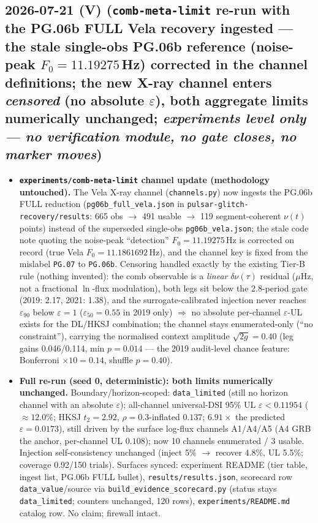 \subsection*{2026-07-21 (V) (\texttt{comb-meta-limit} re-run with the PG.06b FULL Vela recovery ingested --- the stale single-obs PG.06b reference (noise-peak $F_0=11.19275$\,Hz) corrected in the channel definitions; the new X-ray channel enters \emph{censored} (no absolute $\varepsilon$), both aggregate limits numerically unchanged; \emph{experiments level only --- no verification module, no gate closes, no marker moves})}
\begin{itemize}[leftmargin=1.5em]
\item \textbf{\texttt{experiments/comb-meta-limit} channel update (methodology untouched).} The Vela
X-ray channel (\texttt{channels.py}) now ingests the PG.06b FULL reduction
(\texttt{pg06b\_full\_vela.json} in \texttt{pulsar-glitch-recovery/results}: 665 obs $\to$ 491
usable $\to$ 119 segment-coherent $\nu(t)$ points) instead of the superseded single-obs
\texttt{pg06b\_vela.json};
the stale code note quoting the noise-peak ``detection'' $F_0=11.19275$\,Hz is corrected on record
(true Vela $F_0=11.1861692$\,Hz), and the channel key is fixed from the mislabel \texttt{PG.07} to
\texttt{PG.06b}. Censoring handled exactly by the existing Tier-B rule (nothing invented): the comb
observable is a \emph{linear} $\delta\nu(\tau)$ residual ($\mu$Hz, not a fractional $\ln$-flux
modulation), both legs sit below the 2.8-period gate (2019: 2.17, 2021: 1.38), and the
surrogate-calibrated injection never reaches $\varepsilon_{90}$ below $\varepsilon=1$
($\varepsilon_{50}=0.55$ in 2019 only) $\Rightarrow$ no absolute per-channel $\varepsilon$-UL exists
for the DL/HKSJ combination; the channel stays enumerated-only (``no constraint''), carrying the
normalised context amplitude $\sqrt{2g}=0.40$ (leg gains 0.046/0.114, min $p=0.014$ --- the 2019
audit-level chance feature: Bonferroni $\times10=0.14$, shuffle $p=0.40$).
\item \textbf{Full re-run (seed 0, deterministic): both limits numerically unchanged.}
Boundary/horizon-scoped: \texttt{data\_limited} (still no horizon channel with an absolute
$\varepsilon$); all-channel universal-DSI 95\% UL $\varepsilon<0.11954$ ($\approx12.0\%$; HKSJ
$t_2=2.92$, $\rho=0.3$-inflated $0.137$; $6.91\times$ the predicted $\varepsilon=0.0173$), still
driven by the surface log-flux channels A1/A4/A5 (A4 GRB the anchor, per-channel UL $0.108$); now 10
channels enumerated / 3 usable. Injection self-consistency unchanged (inject 5\% $\to$ recover
4.8\%, UL 5.5\%; coverage 0.92/150 trials). Surfaces synced: experiment README (tier table, ingest
list, PG.06b FULL bullet), \texttt{results/results.json}, scorecard row \texttt{data\_value}/source
via \texttt{build\_evidence\_scorecard.py} (status stays \texttt{data\_limited}; counters unchanged,
120 rows), \texttt{experiments/README.md} catalog row. No claim; firewall intact.
\end{itemize}

